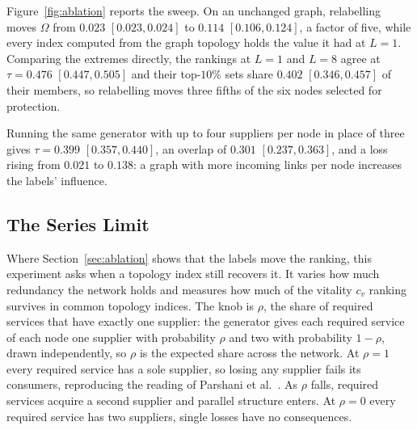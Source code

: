 \documentclass{svproc}
\begin{document}
Figure~\ref{fig:ablation} reports the sweep. On an unchanged graph, relabelling
moves $\Omega$ from $0.023$ $[0.023, 0.024]$ to $0.114$ $[0.106, 0.124]$, a factor
of five, while every index computed from the graph topology holds the value it had
at $L=1$. Comparing the extremes directly, the rankings at $L=1$ and $L=8$ agree at
$\tau = 0.476$ $[0.447, 0.505]$ and their top-$10\%$ sets share $0.402$ $[0.346,
0.457]$ of their members, so relabelling moves three fifths of the six nodes
selected for protection. 

Running the same generator with up to four suppliers per
node in place of three gives $\tau = 0.399$ $[0.357, 0.440]$, an overlap of $0.301$
$[0.237, 0.363]$, and a loss rising from $0.021$ to $0.138$: a graph with more
incoming links per node increases the labels' influence.



\subsection{The Series Limit}
\label{sec:series}

Where Section~\ref{sec:ablation} shows that the labels move the ranking, this
experiment asks when a topology index still recovers it. It varies how much
redundancy the network holds and measures how much of the vitality $c_v$ ranking
survives in common topology indices. The knob is $\rho$, the share of required
services that have exactly one supplier: the generator gives each required service
of each node one supplier with probability $\rho$ and two with probability $1 -
\rho$, drawn independently, so $\rho$ is the expected share across the network. At
$\rho = 1$ every required service has a sole supplier, so losing any supplier
fails its consumers, reproducing the reading of Parshani et al.~\cite{parshani_critical_2011}. As
$\rho$ falls, required services acquire a second supplier and parallel structure
enters. At $\rho = 0$ every required service has two suppliers, single losses have no consequences.
\end{document}
